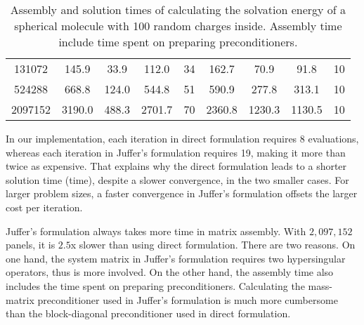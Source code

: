 \begin{table*}[]
\begin{tabular}{c|cccc|cccc}
    131072                                                       & 145.9                                                    & 33.9                                                        & 112.0                                                    & 34            & 162.7                                                    & 70.9                                                        & 91.8                                                     & 10            \\
    524288                                                       & 668.8                                                    & 124.0                                                       & 544.8                                                    & 51            & 590.9                                                    & 277.8                                                       & 313.1                                                    & 10            \\
    2097152                                                      & 3190.0                                                   & 488.3                                                       & 2701.7                                                   & 70            & 2360.8                                                   & 1230.3                                                      & 1130.5                                                   & 10           
    \end{tabular}
    \caption{Assembly and solution times of calculating the solvation energy of a spherical molecule with 100 random charges inside.
    Assembly time include time spent on preparing preconditioners.}
    \label{tab:sphere_time}
\end{table*}

In our implementation, each iteration in direct formulation requires $8$ \fmm evaluations, whereas each iteration in Juffer's formulation requires 19, making it more than twice as expensive.
That explains why the direct formulation leads to a shorter solution time (\gmres time), despite a slower convergence, in the two smaller cases.
For larger problem sizes, a faster convergence in Juffer's formulation offsets the larger cost per iteration.

Juffer's formulation always takes more time in matrix assembly.
With $2,097,152$ panels, it is $2.5$x slower than using direct formulation.
There are two reasons.
On one hand, the system matrix in Juffer's formulation requires two hypersingular operators, thus is more involved.
On the other hand, the assembly time also includes the time spent on preparing preconditioners.
Calculating the mass-matrix preconditioner used in Juffer's formulation is much more cumbersome than the block-diagonal preconditioner used in direct formulation.

